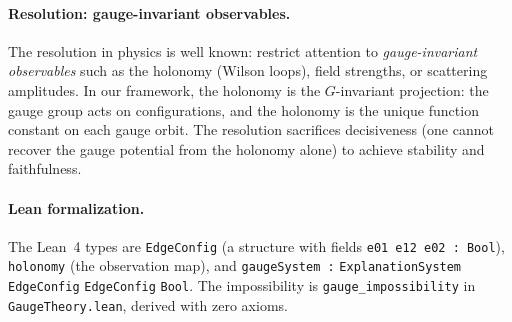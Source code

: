 \paragraph{Resolution: gauge-invariant observables.}
The resolution in physics is well known: restrict attention to
\emph{gauge-invariant observables} such as the holonomy (Wilson loops),
field strengths, or scattering amplitudes.  In our framework, the holonomy
is the $G$-invariant projection: the gauge group acts on configurations,
and the holonomy is the unique function constant on each gauge orbit.
The resolution sacrifices decisiveness (one cannot recover the gauge
potential from the holonomy alone) to achieve stability and faithfulness.

\paragraph{Lean formalization.}
The Lean~4 types are \texttt{EdgeConfig} (a structure with fields
\texttt{e01 e12 e02 : Bool}), \texttt{holonomy} (the observation map),
and \texttt{gaugeSystem\,:} \texttt{ExplanationSystem} \texttt{EdgeConfig} \texttt{EdgeConfig} \texttt{Bool}.
The impossibility is \texttt{gauge\_impossibility} in
\texttt{GaugeTheory.lean}, derived with zero axioms.
